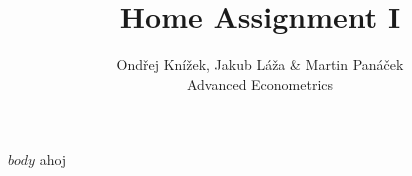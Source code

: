 \documentclass{article}
\begin{document}
\title{Home Assignment I}
\author{ 
Ondřej Knížek, Jakub Láža \& Martin Panáček \\%
Advanced Econometrics} 
\maketitle 
$body$
ahoj
\end{document}

